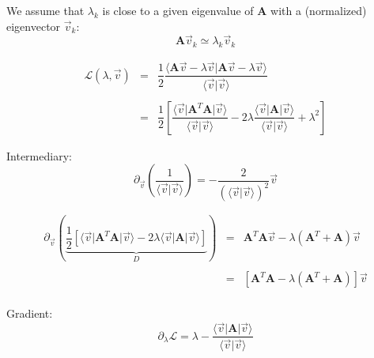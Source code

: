 \documentclass[aps,12pt]{revtex4}
\begin{document}
We assume that $\lambda_k$ is close to a given eigenvalue of $\bm{A}$ with a (normalized) eigenvector $\vec{v}_k$:
\begin{equation}
	\bm{A} \vec{v}_k \simeq \lambda_k \vec{v}_k
\end{equation}

\begin{equation}
\begin{array}{rcl}
	\mathcal{L}(\lambda,\vec{v}) & =  &
	\dfrac{1}{2}
	\dfrac{ 
	\langle \bm{A}\vec{v} - \lambda \vec{v} \vert \bm{A}\vec{v} - \lambda \vec{v}\rangle
	}
	{
	\langle \vec{v} \vert \vec{v} \rangle 
	}
	\\
	\\
	 & = & \dfrac{1}{2}\left\lbrack 
	 \dfrac{\langle \vec{v} \vert \bm{A}^T \bm{A} \vert \vec{v} \rangle}{\langle \vec{v} \vert \vec{v} \rangle }
	 -2 \lambda \dfrac{\langle \vec{v} \vert \bm{A} \vert \vec{v} \rangle }{\langle \vec{v} \vert \vec{v} \rangle }
	 +\lambda^2
	 \right\rbrack
\end{array}
\end{equation}

Intermediary:
\begin{equation}
	\partial_{\vec{v}} \left( 
	\dfrac{1}{\langle \vec{v} \vert \vec{v} \rangle } 
	\right) = -\dfrac{2}{ \left(\langle \vec{v} \vert \vec{v} \rangle\right)^2 } \vec{v}
\end{equation}

\begin{equation}
\begin{array}{rcl}
	\partial_{\vec{v}} \left( \underbrace{\dfrac{1}{2} \left[ \langle \vec{v} \vert \bm{A}^T \bm{A} \vert \vec{v} \rangle - 2 \lambda \langle \vec{v} \vert \bm{A} \vert \vec{v} \rangle\right]}_{D} \right) 
	& = &  \bm{A}^T \bm{A}   \vec{v} - \lambda \left( \bm{A}^T + \bm{A} \right) \vec{v} \\
	\\
	& = & \left\lbrack \bm{A}^T \bm{A} - \lambda \left( \bm{A}^T + \bm{A}\right) \right\rbrack \vec{v} \\
\end{array}
\end{equation}

Gradient:
\begin{equation}
	\partial_\lambda \mathcal{L} = \lambda - \dfrac{\langle \vec{v} \vert \bm{A} \vert \vec{v} \rangle }{\langle \vec{v} \vert \vec{v} \rangle }
\end{equation}
\end{document}
